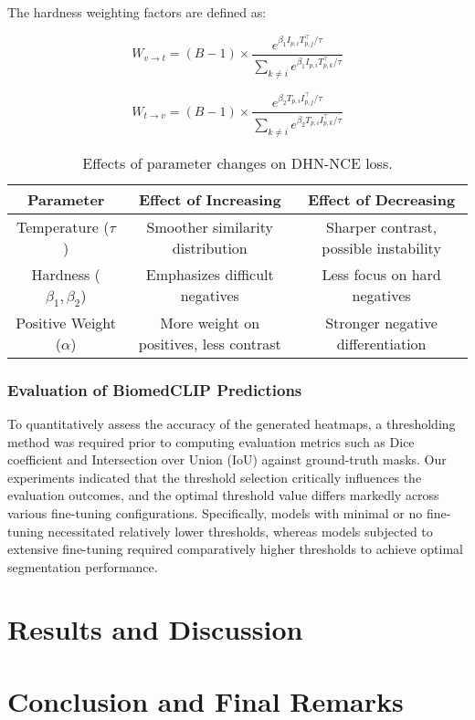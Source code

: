 \documentclass[./dissertation.tex]{subfiles}
\begin{document}
The hardness weighting factors are defined as:

\begin{equation}
    W_{v \to t} = (B-1) \times \frac{e^{\beta_1 I_{p,i} T_{p,j}^\top / \tau}}{\sum_{k \neq i} e^{\beta_1 I_{p,i} T_{p,k}^\top / \tau}}
\end{equation}

\begin{equation}
    W_{t \to v} = (B-1) \times \frac{e^{\beta_2 T_{p,i} I_{p,j}^\top / \tau}}{\sum_{k \neq i} e^{\beta_2 T_{p,i} I_{p,k}^\top / \tau}}
\end{equation}


\begin{table}
    \caption{Effects of parameter changes on DHN-NCE loss.}
    \centering
    \label{tbl:param_change_effect}
    \begin{tabular}{|c|c|c|}
        \hline
        \textbf{Parameter}                & \textbf{Effect of Increasing}           & \textbf{Effect of Decreasing}          \\
        \hline
        Temperature (\( \tau \))          & Smoother similarity distribution        & Sharper contrast, possible instability \\
        \hline
        Hardness (\( \beta_1, \beta_2 \)) & Emphasizes difficult negatives          & Less focus on hard negatives           \\
        \hline
        Positive Weight (\( \alpha \))    & More weight on positives, less contrast & Stronger negative differentiation      \\
        \hline
    \end{tabular}
\end{table}


\subsubsection{Evaluation of BiomedCLIP Predictions}

To quantitatively assess the accuracy of the generated heatmaps, a thresholding method was required prior to computing evaluation metrics such as Dice coefficient and Intersection over Union (IoU) against ground-truth masks. Our experiments indicated that the threshold selection critically influences the evaluation outcomes, and the optimal threshold value differs markedly across various fine-tuning configurations. Specifically, models with minimal or no fine-tuning necessitated relatively lower thresholds, whereas models subjected to extensive fine-tuning required comparatively higher thresholds to achieve optimal segmentation performance.


\section{Results and Discussion}



\section{Conclusion and Final Remarks}
\end{document}
